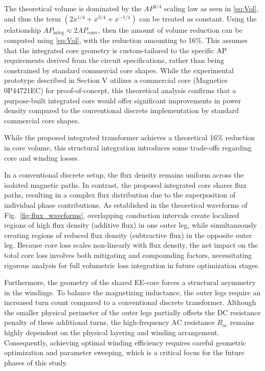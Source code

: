 \documentclass[lettersize,journal]{IEEEtran}
\begin{document}
The theoretical volume is dominated by the $AP^{3/4}$ scaling law as seen in \eqref{eq:Vol}, and thus the term $\left( 2x^{1/4} + x^{3/4} + x^{-1/4} \right)$ can be treated as constant. Using the relationship $AP_{\mathrm{integ}} \approx 2 AP_{\mathrm{conv}}$, then the amount of volume reduction can be computed using \eqref{eq:Vol}, with the reduction amounting to 16\%. This assumes that the integrated core geometry is custom-tailored to the specific AP requirements derived from the circuit specifications, rather than being constrained by standard commercial core shapes. While the experimental prototype described in Section V utilizes a commercial core (Magnetics 0P44721EC) for proof-of-concept, this theoretical analysis confirms that a purpose-built integrated core would offer significant improvements in power density compared to the conventional discrete implementation by standard commercial core shapes.

While the proposed integrated transformer achieves a theoretical 16\% reduction in core volume, this structural integration introduces some trade-offs regarding core and winding losses.

In a conventional discrete setup, the flux density remains uniform across the isolated magnetic paths. In contrast, the proposed integrated core shares flux paths, resulting in a complex flux distribution due to the superposition of individual phase contributions. As established in the theoretical waveforms of Fig.~\ref{fig:flux_waveforms}, overlapping conduction intervals create localized regions of high flux density (additive flux) in one outer leg, while simultaneously creating regions of reduced flux density (subtractive flux) in the opposite outer leg. Because core loss scales non-linearly with flux density, the net impact on the total core loss involves both mitigating and compounding factors, necessitating rigorous analysis for full volumetric loss integration in future optimization stages.

Furthermore, the geometry of the shared EE-core forces a structural asymmetry in the windings. To balance the magnetizing inductance, the outer legs require an increased turn count compared to a conventional discrete transformer. Although the smaller physical perimeter of the outer legs partially offsets the DC resistance penalty of these additional turns, the high-frequency AC resistance $R_{\mathrm{ac}}$ remains highly dependent on the physical layering and winding arrangement. Consequently, achieving optimal winding efficiency requires careful geometric optimization and parameter sweeping, which is a critical focus for the future phases of this study.
\end{document}
